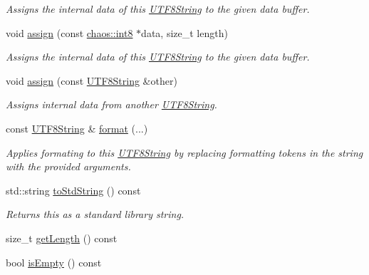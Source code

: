 \begin{DoxyCompactItemize}
\begin{DoxyCompactList}\small\item\em Assigns the internal data of this \hyperlink{classchaos_1_1str_1_1_u_t_f8_string}{U\-T\-F8\-String} to the given data buffer. \end{DoxyCompactList}\item 
void \hyperlink{classchaos_1_1str_1_1_u_t_f8_string_a399d279254a826c36ec8815122ea1883}{assign} (const \hyperlink{namespacechaos_a56015674cfe4ad1fc583c3da6c724d8a}{chaos\-::int8} $\ast$data, size\-\_\-t length)
\begin{DoxyCompactList}\small\item\em Assigns the internal data of this \hyperlink{classchaos_1_1str_1_1_u_t_f8_string}{U\-T\-F8\-String} to the given data buffer. \end{DoxyCompactList}\item 
void \hyperlink{classchaos_1_1str_1_1_u_t_f8_string_aff351b1a6276e5e59717bc6c3b67818c}{assign} (const \hyperlink{classchaos_1_1str_1_1_u_t_f8_string}{U\-T\-F8\-String} \&other)
\begin{DoxyCompactList}\small\item\em Assigns internal data from another \hyperlink{classchaos_1_1str_1_1_u_t_f8_string}{U\-T\-F8\-String}. \end{DoxyCompactList}\item 
const \hyperlink{classchaos_1_1str_1_1_u_t_f8_string}{U\-T\-F8\-String} \& \hyperlink{classchaos_1_1str_1_1_u_t_f8_string_a4103c2df515893977bed1f8fbdc6ff4e}{format} (...)
\begin{DoxyCompactList}\small\item\em Applies formating to this \hyperlink{classchaos_1_1str_1_1_u_t_f8_string}{U\-T\-F8\-String} by replacing formatting tokens in the string with the provided arguments. \end{DoxyCompactList}\item 
std\-::string \hyperlink{classchaos_1_1str_1_1_u_t_f8_string_a4febd35eab6e30bbcf2bdf38097a2fd6}{to\-Std\-String} () const 
\begin{DoxyCompactList}\small\item\em Returns this as a standard library string. \end{DoxyCompactList}\item 
size\-\_\-t \hyperlink{classchaos_1_1str_1_1_u_t_f8_string_a16c5dc861a7a62d1595af424b3b4f58e}{get\-Length} () const 
\item 
bool \hyperlink{classchaos_1_1str_1_1_u_t_f8_string_a6011a783e7fdc46a39996729651ccd76}{is\-Empty} () const 

\end{DoxyCompactItemize}
